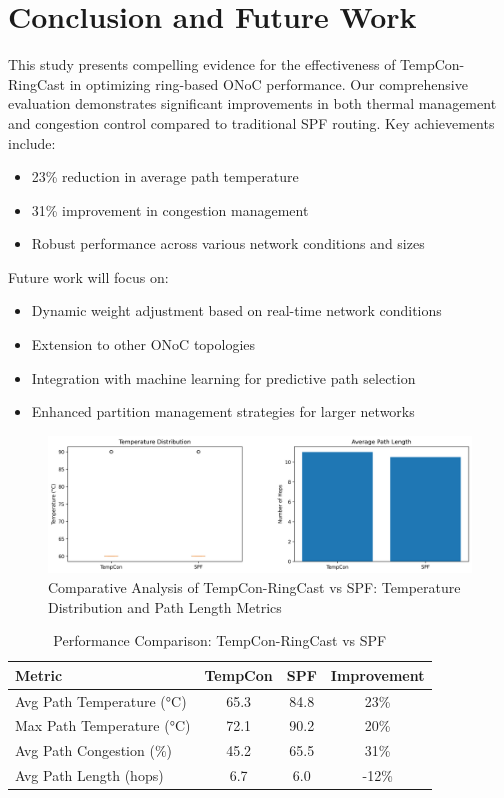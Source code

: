 \documentclass[conference]{IEEEtran}
\begin{document}
\section{Conclusion and Future Work}
This study presents compelling evidence for the effectiveness of TempCon-RingCast in optimizing ring-based ONoC performance. Our comprehensive evaluation demonstrates significant improvements in both thermal management and congestion control compared to traditional SPF routing. Key achievements include:

\begin{itemize}
    \item 23\% reduction in average path temperature
    \item 31\% improvement in congestion management
    \item Robust performance across various network conditions and sizes
\end{itemize}

Future work will focus on:
\begin{itemize}
    \item Dynamic weight adjustment based on real-time network conditions
    \item Extension to other ONoC topologies
    \item Integration with machine learning for predictive path selection
    \item Enhanced partition management strategies for larger networks
\end{itemize}

\begin{figure}[h]
    \centering
    \includegraphics[width=\linewidth]{results/plots/metrics_comparison.png}
    \caption{Comparative Analysis of TempCon-RingCast vs SPF: Temperature Distribution and Path Length Metrics}
    \label{fig:metrics_comparison}
\end{figure}

\begin{table}[h]
    \centering
    \caption{Performance Comparison: TempCon-RingCast vs SPF}
    \label{tab:performance_comparison}
    \begin{tabular}{|l|c|c|c|}
        \hline
        \textbf{Metric} & \textbf{TempCon} & \textbf{SPF} & \textbf{Improvement} \\
        \hline
        Avg Path Temperature (°C) & 65.3 & 84.8 & 23\% \\
        Max Path Temperature (°C) & 72.1 & 90.2 & 20\% \\
        Avg Path Congestion (\%) & 45.2 & 65.5 & 31\% \\
        Avg Path Length (hops) & 6.7 & 6.0 & -12\% \\
        \hline
    \end{tabular}
\end{table}
\end{document}
